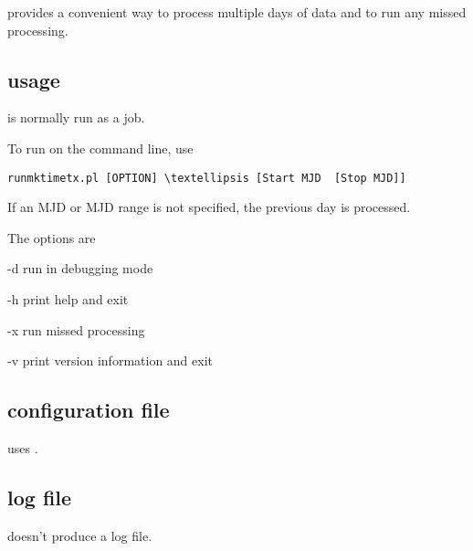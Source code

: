 
 provides a convenient way to process multiple days of data and to run any missed processing.

	
\subsection{usage}
 is normally run as a  job.

To run on the command line, use
\begin{lstlisting}
runmktimetx.pl [OPTION] \textellipsis [Start MJD  [Stop MJD]]
\end{lstlisting}
If an MJD or MJD range is not specified, the previous day is processed.

The options are
\begin{description*}
	\item[-d]	run in debugging mode
	\item[-h]	print help and exit
	\item[-x] run missed processing
	\item[-v]	print version information and exit
\end{description*}

\subsection{configuration file}
 uses .

\subsection{log file}
 doesn't produce a log file.
